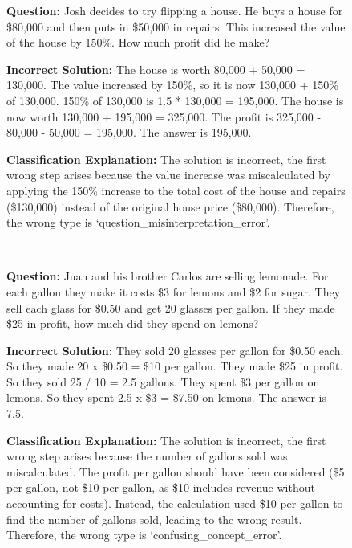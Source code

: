 \begin{figure}[!ht]
    \centering
    \small
    \begin{minipage}{0.9\textwidth}
        \begin{tcolorbox}[boxrule=0.5mm, left=1mm, right=1mm, top=1mm, bottom=1mm,title=\textbf{Question Misinterpretation}]
            \textbf{Question:}
            Josh decides to try flipping a house.  He buys a house for \$80,000 and then puts in \$50,000 in repairs.  This increased the value of the house by 150\%.  How much profit did he make? 

            \textbf{Incorrect Solution:}
            The house is worth 80,000 + 50,000 = 130,000.  The value increased by 150\%, so it is now 130,000 + 150\% of 130,000.  150\% of 130,000 is 1.5 * 130,000 = 195,000.  The house is now worth 130,000 + 195,000 = 325,000.  The profit is 325,000 - 80,000 - 50,000 = 195,000.  The answer is 195,000.

            \textbf{Classification Explanation:}
The solution is incorrect, the first wrong step arises because the value increase was miscalculated by applying the 150\% increase to the total cost of the house and repairs (\$130,000) instead of the original house price (\$80,000). Therefore, the wrong type is `question\_misinterpretation\_error'.

        \end{tcolorbox}
    \end{minipage}
    \\
    \begin{minipage}{0.9\textwidth}
        \begin{tcolorbox}[boxrule=0.5mm, left=1mm, right=1mm, top=1mm, bottom=1mm,title=\textbf{Confusing Concept Error}]
            \textbf{Question:}
            Juan and his brother Carlos are selling lemonade. For each gallon they make it costs \$3 for lemons and \$2 for sugar. They sell each glass for \$0.50 and get 20 glasses per gallon. If they made \$25 in profit, how much did they spend on lemons?

            \textbf{Incorrect Solution:}
            They sold 20 glasses per gallon for \$0.50 each. So they made 20 x \$0.50 = \$10 per gallon. They made \$25 in profit. So they sold 25 / 10 = 2.5 gallons. They spent \$3 per gallon on lemons. So they spent 2.5 x \$3 = \$7.50 on lemons. The answer is 7.5.
            
            \textbf{Classification Explanation:}
            The solution is incorrect, the first wrong step arises because the number of gallons sold was miscalculated. The profit per gallon should have been considered (\$5 per gallon, not \$10 per gallon, as \$10 includes revenue without accounting for costs). Instead, the calculation used \$10 per gallon to find the number of gallons sold, leading to the wrong result. Therefore, the wrong type is `confusing\_concept\_error'.


\end{tcolorbox}
\end{minipage}
\end{figure}
